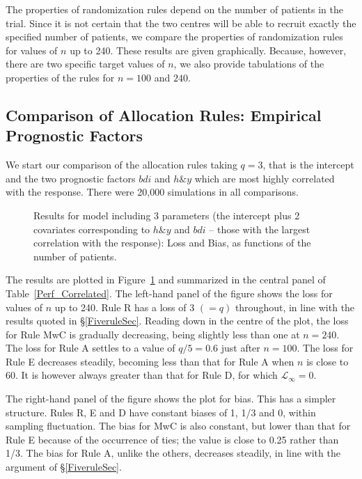 \documentclass[number,12pt,review]{elsarticle}
\begin{document}
The properties of randomization rules depend on the number of patients in the trial. Since it is not certain that the two centres will be able to recruit exactly the specified number of patients, we compare the properties of randomization rules for values of $n$ up to 240. These results are  given graphically. Because, however, there are two specific target values of $n$, we also provide tabulations of the properties of the rules for $n=100$ and $240$.

\subsection{Comparison of Allocation Rules: Empirical Prognostic Factors}

\label{compsec}

We start our comparison of the allocation rules taking $q = 3$, that is the intercept and the two prognostic factors $bdi$ and $h\&y$ which are most highly correlated with the response. There were 20,000 simulations in all comparisons.

\begin{figure}[ht]
\centering
 \hspace*{4mm}%
 \caption{Results for model including 3 parameters (the intercept plus 2 covariates corresponding
to $h\&y$ and $bdi$ -- those with the largest correlation with the response):
 \protect{} Loss and
 \protect{} Bias, as functions of the number of patients.}
 \label{2covarplus1}
\end{figure}

The results are plotted in Figure~\ref{2covarplus1} and summarized in the central panel of Table~\ref{Perf_Correlated}. The left-hand panel of the figure shows the loss for values of $n$ up to 240. Rule R has a loss of 3 $(=q)$ throughout, in line with the results quoted in \S\ref{FiveruleSec}. Reading down in the centre of the plot, the loss for Rule MwC is gradually decreasing, being slightly less than one at $n=240$. The loss for Rule A settles to a value of $q/5 = 0.6$ just after $n = 100$. The loss for Rule E decreases steadily, becoming less than that for Rule A when $n$ is close to 60. It is however always greater than that for Rule D, for which $\mathcal{L}_{\infty} = 0.$

The right-hand panel of the figure shows the plot for bias. This has a simpler structure. Rules R, E and D have constant biases of 1, 1/3 and 0, within sampling fluctuation. The bias for MwC is also constant, but lower than that for Rule E because of the occurrence of ties; the value is close to 0.25 rather than 1/3.  The bias for Rule A, unlike the others, decreases steadily, in line with the argument of \S\ref{FiveruleSec}.
\end{document}
